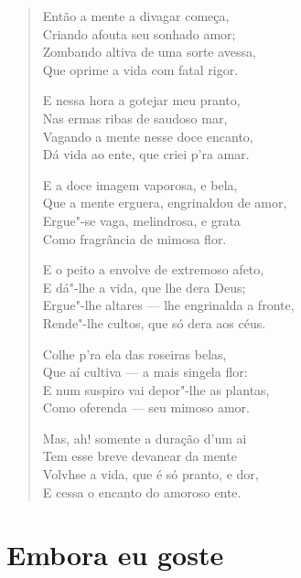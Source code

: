 \begin{verse}
Então a mente a divagar começa,\\
Criando afouta seu sonhado amor;\\
Zombando altiva de uma sorte avessa,\\
Que oprime a vida com fatal rigor.

E nessa hora a gotejar meu pranto,\\
Nas ermas ribas de saudoso mar,\\
Vagando a mente nesse doce encanto,\\
Dá vida ao ente, que criei p'ra amar.

E a doce imagem vaporosa, e bela,\\
Que a mente erguera, engrinaldou de amor,\\
Ergue"-se vaga, melindrosa, e grata\\
Como fragrância de mimosa flor.

E o peito a envolve de extremoso afeto,\\
E dá"-lhe a vida, que lhe dera Deus;\\
Ergue"-lhe altares --- lhe engrinalda a fronte,\\
Rende"-lhe cultos, que só dera aos céus.

Colhe p'ra ela das roseiras belas,\\
Que aí cultiva --- a mais singela flor:\\
E num suspiro vai depor"-lhe as plantas,\\
Como oferenda --- seu mimoso amor.

Mas, ah! somente a duração d'um ai\\
Tem esse breve devanear da mente\\
Volvhse a vida, que é só pranto, e dor,\\
E cessa o encanto do amoroso ente.
\end{verse}

\chapter{Embora eu goste}

